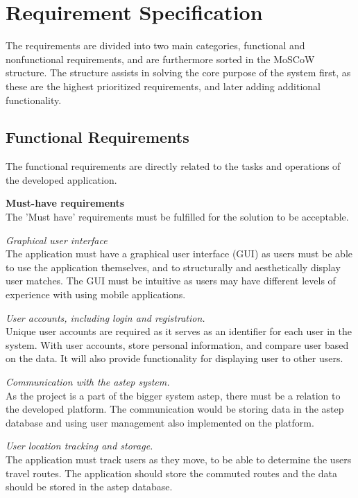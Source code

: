 \section{Requirement Specification}\label{sec:req}
The requirements are divided into two main categories, functional and nonfunctional requirements, and are furthermore sorted in the MoSCoW \cite{moscow} structure.
The structure assists in solving the core purpose of the system first, as these are the highest prioritized requirements, and later adding additional functionality.


\subsection{Functional Requirements}
The functional requirements are directly related to the tasks and operations of the developed application.

\textbf{Must-have requirements}\\
The 'Must have' requirements must be fulfilled for the solution to be acceptable.

\textit{Graphical user interface}\\
The application must have a graphical user interface (GUI) as users must be able to use the application themselves, and to structurally and aesthetically display user matches. 
The GUI must be intuitive as users may have different levels of experience with using mobile applications.

\textit{User accounts, including login and registration.}\\
Unique user accounts are required as it serves as an identifier for each user in the system. 
With user accounts, store personal information, and compare user based on the data. 
It will also provide functionality for displaying user to other users.

\textit{Communication with the \gls{astep} system.}\\
As the project is a part of the bigger system \gls{astep}, there must be a relation to the developed platform. 
The communication would be storing data in the \gls{astep} database and using user management also implemented on the platform.

\textit{User location tracking and storage.}\\
The application must track users as they move, to be able to determine the users travel routes.
The application should store the commuted routes and the data should be stored in the \gls{astep} database.

